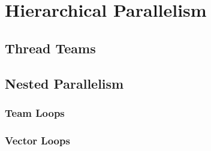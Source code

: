 
\chapter{Hierarchical Parallelism}
\section{Thread Teams}
\section{Nested Parallelism}
\subsection{Team Loops}
\subsection{Vector Loops}
